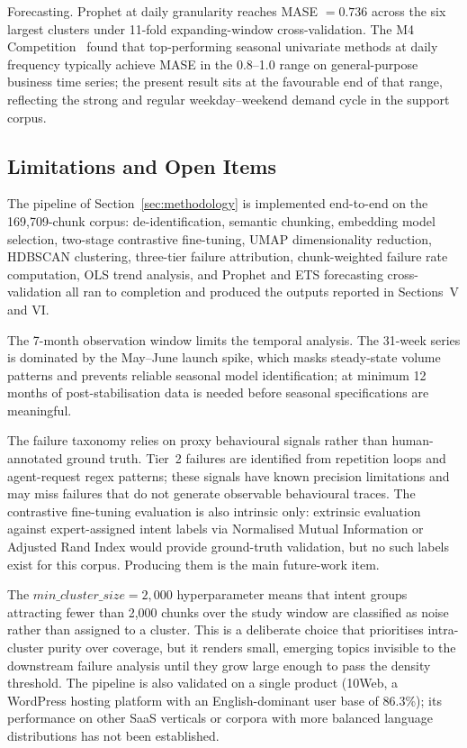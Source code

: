 \documentclass[conference]{IEEEtran}
\begin{document}
Forecasting. Prophet at daily granularity reaches MASE $= 0.736$ across the six largest clusters under 11-fold expanding-window cross-validation. The M4 Competition~\cite{makridakis2018m4} found that top-performing seasonal univariate methods at daily frequency typically achieve MASE in the 0.8--1.0 range on general-purpose business time series; the present result sits at the favourable end of that range, reflecting the strong and regular weekday--weekend demand cycle in the support corpus.
\subsection{Limitations and Open Items}

The pipeline of Section~\ref{sec:methodology} is implemented end-to-end on the 169{,}709-chunk corpus: de-identification, semantic chunking, embedding model selection, two-stage contrastive fine-tuning, UMAP dimensionality reduction, HDBSCAN clustering, three-tier failure attribution, chunk-weighted failure rate computation, OLS trend analysis, and Prophet and ETS forecasting cross-validation all ran to completion and produced the outputs reported in Sections~V and VI.

The 7-month observation window limits the temporal analysis. The 31-week series is dominated by the May--June launch spike, which masks steady-state volume patterns and prevents reliable seasonal model identification; at minimum 12 months of post-stabilisation data is needed before seasonal specifications are meaningful.

The failure taxonomy relies on proxy behavioural signals rather than human-annotated ground truth. Tier~2 failures are identified from repetition loops and agent-request regex patterns; these signals have known precision limitations and may miss failures that do not generate observable behavioural traces. The contrastive fine-tuning evaluation is also intrinsic only: extrinsic evaluation against expert-assigned intent labels via Normalised Mutual Information or Adjusted Rand Index would provide ground-truth validation, but no such labels exist for this corpus. Producing them is the main future-work item.

The $min\_cluster\_size{=}2{,}000$ hyperparameter means that intent groups attracting fewer than 2{,}000 chunks over the study window are classified as noise rather than assigned to a cluster. This is a deliberate choice that prioritises intra-cluster purity over coverage, but it renders small, emerging topics invisible to the downstream failure analysis until they grow large enough to pass the density threshold. The pipeline is also validated on a single product (10Web, a WordPress hosting platform with an English-dominant user base of 86.3\%); its performance on other SaaS verticals or corpora with more balanced language distributions has not been established.
\end{document}
